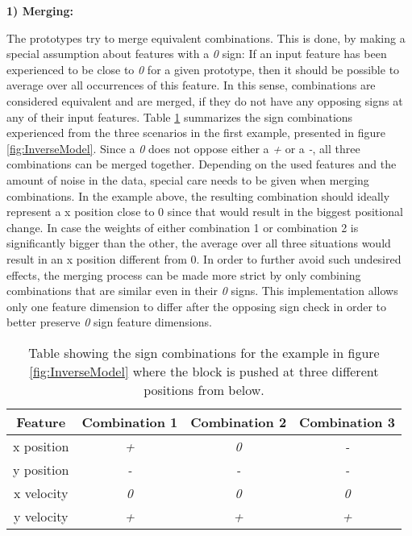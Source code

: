 \textbf{1) Merging:}

The prototypes try to merge equivalent combinations. This is done, by making a special assumption about features with a \textit{0} sign: If an input feature has been experienced to be close to \textit{0} for a given prototype, then it should be possible to average over all occurrences of this feature. 
In this sense, combinations are considered equivalent and are merged, if they do not have any opposing signs at any of their input features.
Table \ref{tab:signCombinations2} summarizes the sign combinations experienced from the three scenarios in the first example, presented in figure \ref{fig:InverseModel}.
Since a \textit{0} does not oppose either a \textit{+} or a \textit{-}, all three combinations can be merged together.
Depending on the used features and the amount of noise in the data, special care needs to be given when merging combinations. In the example above, the resulting combination should ideally represent a x position close to 0 since that would result in the biggest positional change. In case the weights of either combination 1 or combination 2 is significantly bigger than the other, the average over all three situations would result in an x position different from 0.
In order to further avoid such undesired effects, the merging process can be made more strict by only combining combinations that are similar even in their \textit{0} signs.
This implementation allows only one feature dimension to differ after the opposing sign check in order to better preserve \textit{0} sign feature dimensions.

\begin{table}
	\centering
	\begin{tabular}{|c|c|c|c|}
		\hline Feature & Combination 1 & Combination 2 & Combination 3 \\ 
		\hline x position & \textit{+} & \textit{0} & \textit{-} \\ 
		\hline y position & \textit{-} & \textit{-} & \textit{-} \\ 
		\hline x velocity & \textit{0} & \textit{0} & \textit{0} \\
		\hline y velocity & \textit{+} & \textit{+} & \textit{+} \\ 
		\hline 
	\end{tabular} 
	\caption{Table showing the sign combinations for the example in figure \ref{fig:InverseModel} where the block is pushed at three different positions from below.}
	\label{tab:signCombinations2}
\end{table}


